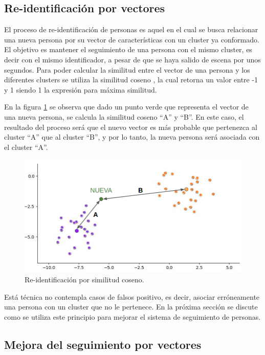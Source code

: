 \subsection{Re-identificación por vectores}

El proceso de re-identificación de personas es aquel en el cual se busca relacionar una nueva persona por su vector de características con un cluster ya conformado. El objetivo es mantener el seguimiento de una persona con el mismo cluster, es decir con el mismo identificador, a pesar de que se haya salido de escena por unos segundos. Para poder calcular la similitud entre el vector de una persona y los diferentes clusters se utiliza la similitud coseno \citep{COSINE_SIMILARITY}, la cual retorna un valor entre -1 y 1 siendo 1 la expresión para máxima similitud.

En la figura \ref{fig:similitudCoseno} se observa que dado un punto verde que representa el vector de una nueva persona, se calcula la similitud coseno ``A'' y ``B''. En este caso, el resultado del proceso será que el nuevo vector es más probable que pertenezca al cluster ``A'' que al cluster ``B'', y por lo tanto, la nueva persona será asociada con el cluster ``A''.

\begin{figure}[ht]
	\centering
	\includegraphics[scale=.6]{./Figures/similitudCoseno.png}
	\caption{Re-identificación por similitud coseno.}
	\label{fig:similitudCoseno}
\end{figure}

Está técnica no contempla casos de falsos positivo, es decir, asociar erróneamente una persona con un cluster que no le pertenece. En la próxima sección se discute como se utiliza este principio para mejorar el sistema de seguimiento de personas.

\subsection{Mejora del seguimiento por vectores}

